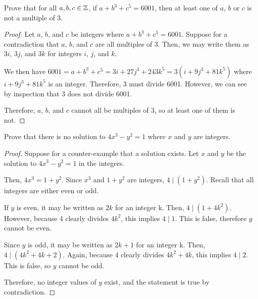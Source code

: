 \question Prove that for all $a, b, c \in \mathbb{Z}$, if $a + b^3 + c^5 = 6001$,
then at least one of $a$, $b$ or $c$ is not a multiple of 3.
\begin{proof}
  Let $a$, $b$, and $c$ be integers where $a + b^3 + c^5 = 6001$.
  Suppose for a contradiction that $a$, $b$, and $c$ are all multiples of 3.
  Then, we may write them as $3i$, $3j$, and $3k$ for integers $i$, $j$, and $k$.

  We then have $6001 = a+b^3+c^5 = 3i+27j^3+243k^5 = 3(i+9j^3+81k^5)$
  where $i+9j^3+81k^5$ is an integer.
  Therefore, 3 must divide 6001.
  However, we can see by inspection that 3 does not divide 6001.

  Therefore, $a$, $b$, and $c$ cannot all be multiples of 3, so at least one of them is not.
\end{proof}


\question Prove that there is no solution to $4x^3 - y^2 = 1$ where $x$ and $y$ are integers.
\begin{proof}


  Suppose for a counter-example that a solution exists.
  Let $x$ and $y$ be the solution to $4x^3-y^2=1$ in the integers.

  Then, $4x^3 = 1+y^2$.
  Since $x^3$ and $1+y^2$ are integers, $4 \mid (1+y^2)$.
  Recall that all integers are either even or odd.

  If $y$ is even, it may be written as $2k$ for an integer k.
  Then, $4 \mid (1+4k^2)$.
  However, because 4 clearly divides $4k^2$, this implies $4 \mid 1$.
  This is false, therefore $y$ cannot be even.

  Since $y$ is odd, it may be written as $2k+1$ for an integer k.
  Then, $4 \mid (4k^2+4k+2)$.
  Again, because 4 clearly divides $4k^2+4k$, this implies $4 \mid 2$.
  This is false, so $y$ cannot be odd.

  Therefore, no integer values of $y$ exist, and the statement is true by contradiction.
\end{proof}



